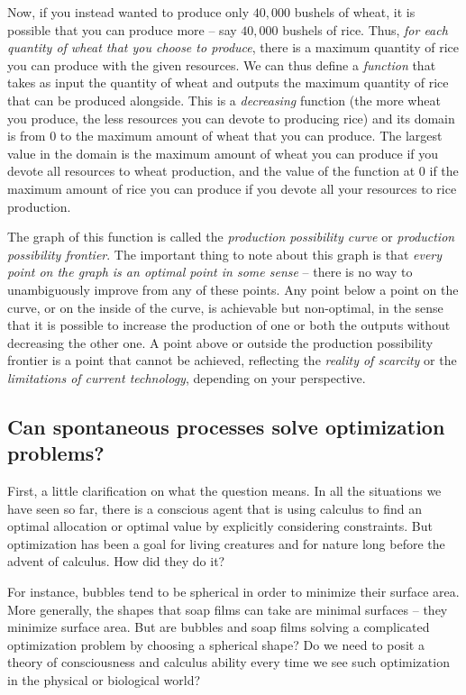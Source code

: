\documentclass[10pt]{amsart}
\begin{document}
Now, if you instead wanted to produce only $40,000$ bushels of wheat,
it is possible that you can produce more -- say $40,000$ bushels of
rice. Thus, {\em for each quantity of wheat that you choose to
produce}, there is a maximum quantity of rice you can produce with the
given resources. We can thus define a {\em function} that takes as
input the quantity of wheat and outputs the maximum quantity of rice
that can be produced alongside. This is a {\em decreasing} function
(the more wheat you produce, the less resources you can devote to
producing rice) and its domain is from $0$ to the maximum amount of
wheat that you can produce. The largest value in the domain is the
maximum amount of wheat you can produce if you devote all resources to
wheat production, and the value of the function at $0$ if the maximum
amount of rice you can produce if you devote all your resources to
rice production.

The graph of this function is called the {\em production possibility
curve} or {\em production possibility frontier}. The important thing
to note about this graph is that {\em every point on the graph is an
optimal point in some sense} -- there is no way to unambiguously
improve from any of these points. Any point below a point on the
curve, or on the inside of the curve, is achievable but non-optimal,
in the sense that it is possible to increase the production of one or
both the outputs without decreasing the other one. A point above or
outside the production possibility frontier is a point that cannot be
achieved, reflecting the {\em reality of scarcity} or the {\em
limitations of current technology}, depending on your perspective.

\subsection{Can spontaneous processes solve optimization problems?}

First, a little clarification on what the question means. In all the
situations we have seen so far, there is a conscious agent that is
using calculus to find an optimal allocation or optimal value by
explicitly considering constraints. But optimization has been a goal
for living creatures and for nature long before the advent of
calculus. How did they do it?

For instance, bubbles tend to be spherical in order to minimize their
surface area. More generally, the shapes that soap films can take are
minimal surfaces -- they minimize surface area. But are bubbles and
soap films solving a complicated optimization problem by choosing a
spherical shape? Do we need to posit a theory of consciousness and
calculus ability every time we see such optimization in the physical
or biological world?
\end{document}
